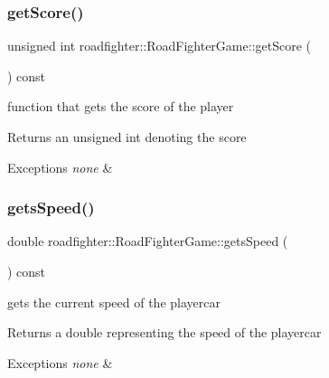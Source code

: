 \subsubsection{\texorpdfstring{get\+Score()}{getScore()}}
{\footnotesize\ttfamily unsigned int roadfighter\+::\+Road\+Fighter\+Game\+::get\+Score (\begin{DoxyParamCaption}{ }\end{DoxyParamCaption}) const}

function that gets the score of the player \begin{DoxyReturn}{Returns}
an unsigned int denoting the score 
\end{DoxyReturn}

\begin{DoxyExceptions}{Exceptions}
{\em none} & \\
\hline
\end{DoxyExceptions}
\mbox{\label{classroadfighter_1_1RoadFighterGame_afd3d3d025119a6f730667b4924a3a42a}} 
\subsubsection{\texorpdfstring{gets\+Speed()}{getsSpeed()}}
{\footnotesize\ttfamily double roadfighter\+::\+Road\+Fighter\+Game\+::gets\+Speed (\begin{DoxyParamCaption}{ }\end{DoxyParamCaption}) const}

gets the current speed of the playercar \begin{DoxyReturn}{Returns}
a double representing the speed of the playercar 
\end{DoxyReturn}

\begin{DoxyExceptions}{Exceptions}
{\em none} & \\
\hline
\end{DoxyExceptions}
\mbox{\label{classroadfighter_1_1RoadFighterGame_a0d14deca7704a246c4953c08a26d411d}} 
